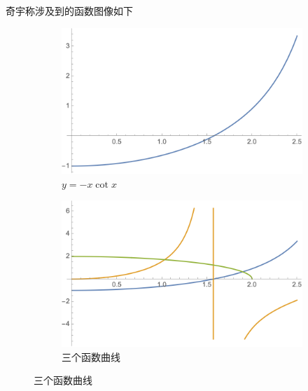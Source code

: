 \documentclass{article}
\begin{document}
        奇宇称涉及到的函数图像如下
        \begin{figure}[H]
            \centering
            \begin{subfigure}{0.48\textwidth}
                    
                \centering
                \includegraphics[scale=0.4]{-xcotx.png}
                \caption{$y=-x \cot{x}$}
                
            \end{subfigure}
            \begin{subfigure}{0.48\textwidth}
                
                \centering
                \includegraphics[scale=0.4]{3plot.png}
                \caption{三个函数曲线}

            \end{subfigure}
              
        \end{figure}
\end{document}
